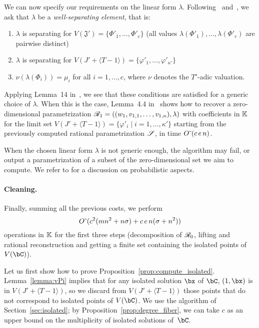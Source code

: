 \documentclass[12pt]{article}
\begin{document}
We can now specify our requirements on the linear form $\lambda$.
Following~\cite{RRS} and~\cite{SaSc16}, we ask that $\lambda$ be a
{\em well-separating element}, that is:
\begin{enumerate}
\item $\lambda$ is separating for $V(\mathfrak{J}')=\{\Phi'_1,\dots,\Phi'_c\}$ (all values $\lambda(\Phi'_1),\dots,\lambda(\Phi'_c)$ are pairwise distinct)
\item $\lambda$ is separating for $V(J' + \langle T-1\rangle) = \{ \varphi'_1,\dots,\varphi'_{\kappa'}\}$
\item $\nu(\lambda(\Phi_i)) = \mu_i$ for all $i=1,\dots,c$, where $\nu$ denotes the $T'$-adic valuation.
\end{enumerate}
Applying Lemma~14 in~\cite[Section 3]{SaSc16}, we see that these
conditions are satisfied for a generic choice of $\lambda$. When this
is the case, Lemma~4.4 in~\cite{RRS} shows how to recover a
zero-dimensional parametrization
$\mathscr{R}_1=((w_1,v_{1,1},\dots,v_{1,n}),\lambda)$ with coefficients in
$\mathbb{K}$ for the limit set $V(J' + \langle T-1\rangle) =\{\varphi'_i \mid
i=1,\dots,{\kappa'}\}$ starting from the previously computed rational
parametrization $\mathscr{S}$, in time ${O}{\,\tilde{ }\,}(c\,e\,n)$.

When the chosen linear form $\lambda$ is not generic enough, the
algorithm may fail, or output a parametrization of a subset of the
zero-dimensional set we aim to compute. We refer to \cite[Remark
  14]{SaSc16} for a discussion on probabilistic aspects.

\paragraph{Cleaning.}
Finally, summing all the previous costs, we perform
$$
{O}{\,\tilde{ }\,}(c^2 (mn^2+n\sigma) + c\, e\,n (\sigma+n^2) )
$$
operations in $\mathbb{K}$ for the first three steps (decomposition of
$\mathscr{R}_0$, lifting and rational reconstruction and getting a finite
set containing the isolated points of $V(\bC)$).

Let us first show how to prove
Proposition~\ref{prop:compute_isolated}.  Lemma~\ref{lemma:vPi}
implies that for any isolated solution $\bx$ of $\bC$, $(1,\bx)$ is in
$V(J' + \langle T-1\rangle)$, so we discard from $V(J' + \langle
T-1\rangle)$ those points that do not correspond to isolated points of
$V(\bC)$. We use the algorithm of Section~\ref{sec:isolated}; by
Proposition~\ref{prop:degree_fiber}, we can take $c$ as an upper bound
on the multiplicity of isolated solutions of~$\bC$.
\end{document}
